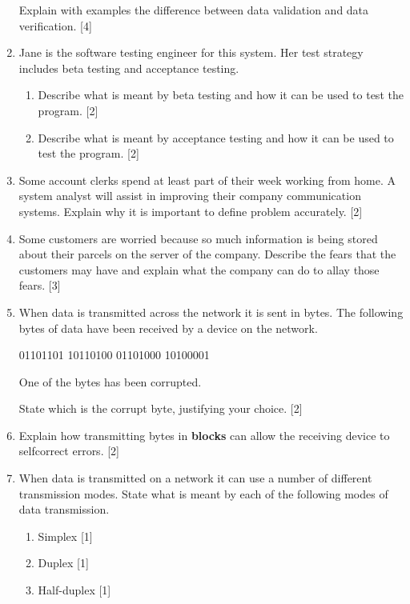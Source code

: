 \begin{enumerate}
Explain with examples the difference between data validation and data
verification. \hfill{}{[}4{]}
\item Jane is the software testing engineer for this system. Her test strategy
includes beta testing and acceptance testing. 
\begin{enumerate}
\item Describe what is meant by beta testing and how it can be used to test
the program. \hfill{} {[}2{]}
\item Describe what is meant by acceptance testing and how it can be used
to test the program. \hfill{} {[}2{]}
\end{enumerate}
\item Some account clerks spend at least part of their week working from
home. A system analyst will assist in improving their company communication
systems. Explain why it is important to define problem accurately.
\hfill{}{[}2{]}
\item Some customers are worried because so much information is being stored
about their parcels on the server of the company. Describe the fears
that the customers may have and explain what the company can do to
allay those fears. \hfill{} {[}3{]}
\item When data is transmitted across the network it is sent in bytes. The
following bytes of data have been received by a device on the network.
\noindent \begin{center}
01101101 10110100 01101000 10100001 
\par\end{center}

One of the bytes has been corrupted.

State which is the corrupt byte, justifying your choice. \hfill{}
{[}2{]}
\item Explain how transmitting bytes in \textbf{blocks} can allow the receiving
device to selfcorrect errors. \hfill{}{[}2{]}
\item When data is transmitted on a network it can use a number of different
transmission modes. State what is meant by each of the following modes
of data transmission. 
\begin{enumerate}
\item Simplex \hfill{}{[}1{]}
\item Duplex \hfill{} {[}1{]}
\item Half-duplex \hfill{} {[}1{]}
\end{enumerate}
\end{enumerate}